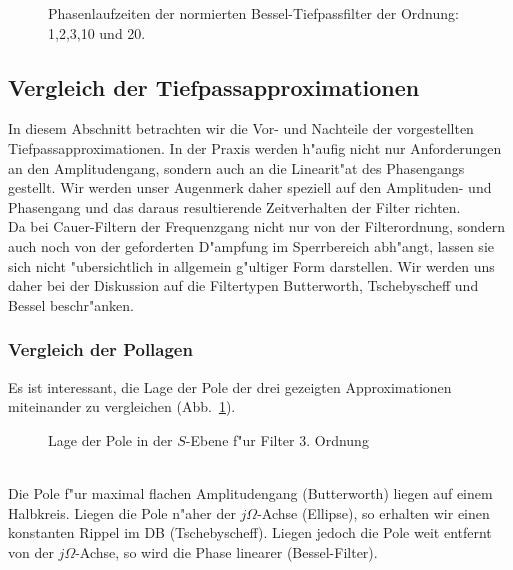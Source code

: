 \begin{figure}[!htb]
\vspace*{0mm}
\begin{center}
\caption{Phasenlaufzeiten der normierten Bessel-Tiefpassfilter der Ordnung: 1,2,3,10 und 20.}
\end{center}
\vspace*{-6mm}
\end{figure}


\clearpage
\subsection{Vergleich der Tiefpassapproximationen}
In diesem Abschnitt betrachten wir die Vor- und Nachteile der vorgestellten
Tief\-pass\-approximationen. In der Praxis werden h"aufig
nicht nur Anforderungen an den Amplitudengang, sondern auch an die
Linearit"at des Phasengangs gestellt. Wir werden unser Augenmerk daher
speziell auf den Amplituden- und Phasengang und das daraus
resultierende Zeitverhalten der
Filter richten.\\
Da bei Cauer-Filtern der Frequenzgang nicht nur von der
Filterordnung, sondern auch noch von der geforderten D"ampfung im
Sperrbereich abh"angt, lassen sie sich nicht "ubersichtlich in
allgemein g"ultiger Form darstellen. Wir werden uns daher bei der
Diskussion auf die Filtertypen Butterworth, Tschebyscheff und Bessel
beschr"anken.

\subsubsection{Vergleich der Pollagen}
Es ist interessant, die Lage der Pole der drei gezeigten Approximationen
miteinander zu vergleichen (Abb.~\ref{lage-pole}).
\begin{figure}[!htb]
\begin{center}
  \caption{Lage der Pole in der $S$-Ebene f"ur Filter 3. Ordnung \label{lage-pole}}
\end{center}
\vspace*{-6mm}
\end{figure}~~\\
\nit Die Pole f"ur maximal flachen Amplitudengang (Butterworth) liegen auf einem
Halbkreis.  Liegen die Pole n"aher der $j\Omega$-Achse (Ellipse), so
erhalten wir einen konstanten Rippel im DB (Tschebyscheff). Liegen jedoch die Pole
weit entfernt von der $j\Omega$-Achse, so wird die Phase linearer (Bessel-Filter).

